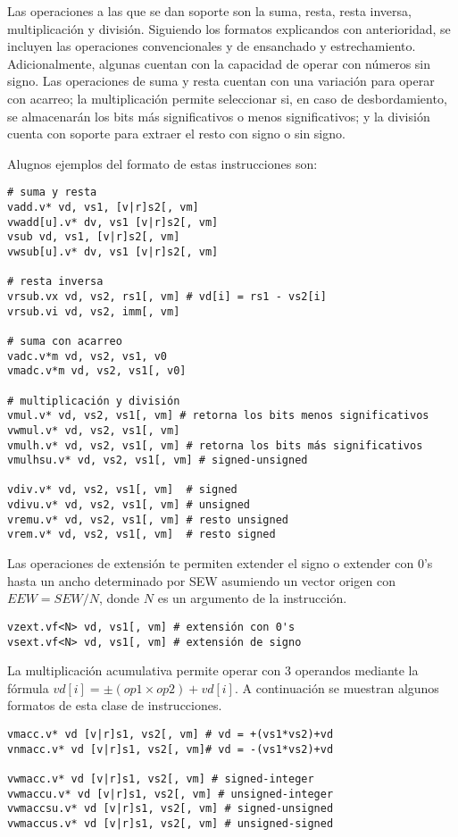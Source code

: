 Las operaciones a las que se dan soporte son la suma, resta, resta inversa,
multiplicación y división. Siguiendo los formatos explicandos con anterioridad,
se incluyen las operaciones convencionales y de ensanchado y estrechamiento.
Adicionalmente, algunas cuentan con la capacidad de operar con números sin
signo. Las operaciones de suma y resta cuentan con una variación para operar
con acarreo; la multiplicación permite seleccionar si, en caso de
desbordamiento, se almacenarán los bits más significativos o menos
significativos; y la división cuenta con soporte para extraer el resto con
signo o sin signo.

Alugnos ejemplos del formato de estas instrucciones son:

\begin{lstlisting}
# suma y resta
vadd.v* vd, vs1, [v|r]s2[, vm]
vwadd[u].v* dv, vs1 [v|r]s2[, vm]
vsub vd, vs1, [v|r]s2[, vm]
vwsub[u].v* dv, vs1 [v|r]s2[, vm]

# resta inversa
vrsub.vx vd, vs2, rs1[, vm] # vd[i] = rs1 - vs2[i]
vrsub.vi vd, vs2, imm[, vm]

# suma con acarreo
vadc.v*m vd, vs2, vs1, v0
vmadc.v*m vd, vs2, vs1[, v0]

# multiplicación y división
vmul.v* vd, vs2, vs1[, vm] # retorna los bits menos significativos
vwmul.v* vd, vs2, vs1[, vm]
vmulh.v* vd, vs2, vs1[, vm] # retorna los bits más significativos
vmulhsu.v* vd, vs2, vs1[, vm] # signed-unsigned

vdiv.v* vd, vs2, vs1[, vm]  # signed
vdivu.v* vd, vs2, vs1[, vm] # unsigned
vremu.v* vd, vs2, vs1[, vm] # resto unsigned
vrem.v* vd, vs2, vs1[, vm]  # resto signed

\end{lstlisting}

Las operaciones de extensión te permiten extender el signo o extender con 0's
hasta un ancho determinado por SEW asumiendo un vector origen con $EEW =
SEW/N$, donde $N$ es un argumento de la instrucción.

\begin{lstlisting}
vzext.vf<N> vd, vs1[, vm] # extensión con 0's
vsext.vf<N> vd, vs1[, vm] # extensión de signo
\end{lstlisting}

La multiplicación acumulativa permite operar con 3 operandos mediante la
fórmula $vd[i] = \pm(op1 \times op2) + vd[i]$. A continuación se muestran
algunos formatos de esta clase de instrucciones.

\begin{lstlisting}
vmacc.v* vd [v|r]s1, vs2[, vm] # vd = +(vs1*vs2)+vd
vnmacc.v* vd [v|r]s1, vs2[, vm]# vd = -(vs1*vs2)+vd

vwmacc.v* vd [v|r]s1, vs2[, vm] # signed-integer
vwmaccu.v* vd [v|r]s1, vs2[, vm] # unsigned-integer
vwmaccsu.v* vd [v|r]s1, vs2[, vm] # signed-unsigned
vwmaccus.v* vd [v|r]s1, vs2[, vm] # unsigned-signed
\end{lstlisting}

